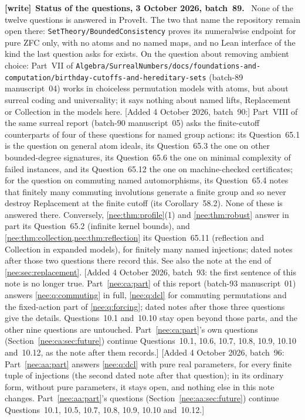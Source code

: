 \documentclass[11pt,letterpaper]{article}
\numberwithin{equation}{section}
\theoremstyle{plain}
\theoremstyle{definition}
\theoremstyle{remark}
\newenvironment{writenote}[1][]{\par\smallskip\begingroup\small\raggedright
 \setlength{\parindent}{1.25em}\noindent\textbf{[write]}\if\relax\detokenize{#1}\relax\else~\textbf{#1.}\fi\ }%
 {\par\endgroup\smallskip}
\begin{document}
\begin{writenote}[Status of the questions, 3 October 2026, batch~89]
None of the twelve questions is answered in ProveIt. The two that name the repository remain open there: \nolinkurl{SetTheory/BoundedConsistency} proves its numeralwise endpoint for pure ZFC only, with no atoms and no named maps, and no Lean interface of the kind the last question asks for exists. On the question about removing ambient choice: Part~VII of \nolinkurl{Algebra/SurrealNumbers/docs/foundations-and-computation/birthday-cutoffs-and-hereditary-sets} (batch-89 manuscript~04) works in choiceless permutation models with atoms, but about surreal coding and universality; it says nothing about named lifts, Replacement or Collection in the models here. [Added 4 October 2026, batch~90:] Part~VIII of the same surreal report (batch-90 manuscript~05) asks the finite-cutoff counterparts of four of these questions for named group actions: its Question~65.1 is the question on general atom ideals, its Question~65.3 the one on other bounded-degree signatures, its Question~65.6 the one on minimal complexity of failed instances, and its Question~65.12 the one on machine-checked certificates; for the question on commuting named automorphisms, its Question~65.4 notes that finitely many commuting involutions generate a finite group and so never destroy Replacement at the finite cutoff (its Corollary~58.2). None of these is answered there. Conversely, \cref{nee:thm:profile}(1) and \cref{nee:thm:robust} answer in part its Question~65.2 (infinite kernel bounds), and \cref{nee:thm:collection,nee:thm:reflection} its Question~65.11 (reflection and Collection in expanded models), for finitely many named injections; dated notes after those two questions there record this. See also the note at the end of \cref{nee:sec:replacement}. [Added 4 October 2026, batch~93: the first sentence of this note is no longer true. Part~\ref{nee:ca:part} of this report (batch-93 manuscript~01) answers \cref{nee:q:commuting} in full, \cref{nee:q:dcl} for commuting permutations and the fixed-action part of \cref{nee:q:forcing}; dated notes after those three questions give the details. Questions~10.1 and~10.10 stay open beyond those parts, and the other nine questions are untouched. Part~\ref{nee:ca:part}'s own questions (Section~\ref{nee:ca:sec:future}) continue Questions~10.1, 10.6, 10.7, 10.8, 10.9, 10.10 and~10.12, as the note after them records.] [Added 4 October 2026, batch~96: Part~\ref{nee:aa:part} answers \cref{nee:q:dcl} with pure real parameters, for every finite tuple of injections (the second dated note after that question); in its ordinary form, without pure parameters, it stays open, and nothing else in this note changes. Part~\ref{nee:aa:part}'s questions (Section~\ref{nee:aa:sec:future}) continue Questions~10.1, 10.5, 10.7, 10.8, 10.9, 10.10 and~10.12.]
\end{writenote}
\end{document}
